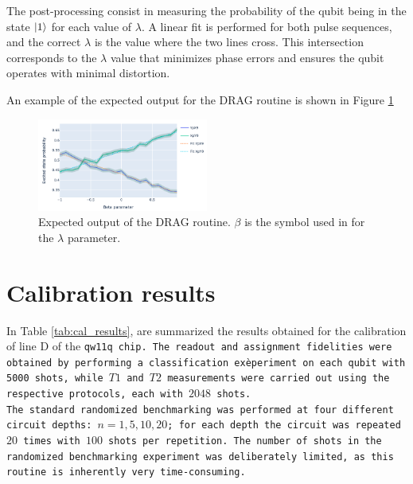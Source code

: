 The post-processing consist in measuring the probability of the qubit being in the state $\ket{1}$ for each value of $\lambda$. 
A linear fit is performed for both pulse sequences, and the correct $\lambda$ is the value where the two lines cross. 
This intersection corresponds to the $\lambda$ value that minimizes phase errors and ensures the qubit operates with minimal distortion.

An example of the expected output for the DRAG routine is shown in Figure \ref{fig:drag}
\begin{figure}[h!]
    \centering
    \includegraphics[width=0.5\textwidth]{figures/png/drag_simple.png}
    \caption{Expected output of the DRAG routine. $\beta$ is the symbol used in \Qibocal for the $\lambda$ parameter.}
    \label{fig:drag}
\end{figure}

\section{Calibration results}

In Table \ref{tab:cal_results}, are summarized the results obtained for the calibration of line D of the \tt{qw11q} chip. 
The readout and assignment fidelities were obtained by performing a classification exèperiment on each qubit with 5000 shots, while $T1$ and $T2$ measurements were carried out using the respective protocols, each with $2048$ shots.\\
The standard randomized benchmarking was performed at four different circuit depths: $n=1,5,10,20$; for each depth the circuit was repeated $20$ times with $100$ shots per repetition. 
The number of shots in the randomized benchmarking experiment was deliberately limited, as this routine is inherently very time-consuming.

